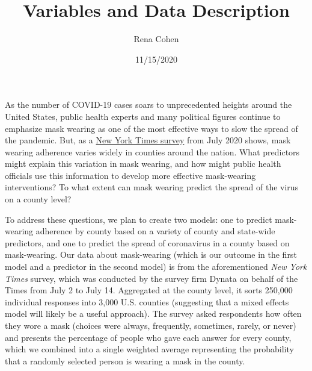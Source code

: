 \documentclass[
]{article}
\title{Variables and Data Description}
\author{Rena Cohen}
\date{11/15/2020}
\begin{document}
\maketitle

As the number of COVID-19 cases soars to unprecedented heights around
the United States, public health experts and many political figures
continue to emphasize mask wearing as one of the most effective ways to
slow the spread of the pandemic. But, as a
\href{https://www.nytimes.com/interactive/2020/07/17/upshot/coronavirus-face-mask-map.html}{New
York Times survey} from July 2020 shows, mask wearing adherence varies
widely in counties around the nation. What predictors might explain this
variation in mask wearing, and how might public health officials use
this information to develop more effective mask-wearing interventions?
To what extent can mask wearing predict the spread of the virus on a
county level?

To address these questions, we plan to create two models: one to predict
mask-wearing adherence by county based on a variety of county and
state-wide predictors, and one to predict the spread of coronavirus in a
county based on mask-wearing. Our data about mask-wearing (which is our
outcome in the first model and a predictor in the second model) is from
the aforementioned \emph{New York Times} survey, which was conducted by
the survey firm Dynata on behalf of the Times from July 2 to July 14.
Aggregated at the county level, it sorts 250,000 individual responses
into 3,000 U.S. counties (suggesting that a mixed effects model will
likely be a useful approach). The survey asked respondents how often
they wore a mask (choices were always, frequently, sometimes, rarely, or
never) and presents the percentage of people who gave each answer for
every county, which we combined into a single weighted average
representing the probability that a randomly selected person is wearing
a mask in the county.
\end{document}
